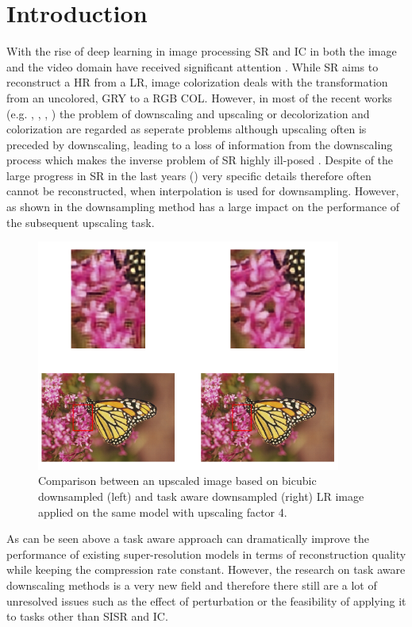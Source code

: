 \newpage
\section{Introduction}
\label{sec:Introduction}
With the rise of deep learning in image processing \ac{SR} and \ac{IC}
in both the image and the video domain have received significant
attention \cite{DLFISRAS}. While SR aims to reconstruct a \ac{HR} from a
\ac{LR}, image colorization deals with the transformation from an uncolored,
\ac{GRY} to a RGB \ac{COL}.
However, in most of the recent works (e.g. \cite{AFPATSISR}, \cite{ESRGAN},
\cite{RBPNFVSR}, \cite{LFVSRTHROFE}) the problem of downscaling and upscaling
or decolorization and colorization are regarded as seperate problems although
upscaling often is preceded by downscaling, leading to a loss of information
from the downscaling process which makes the inverse problem of SR highly
ill-posed \cite{TAID}. Despite of the large progress in SR in the last years
(\cite{DLFISRAS}) very specific details therefore often cannot be reconstructed,
when interpolation is used for downsampling. However, as shown in
 the downsampling method has a large impact on
the performance of the subsequent upscaling task.

\begin{figure}[!htbp]
\centering
\includegraphics[width=10cm]{figures/shrb_vs_shrt_x4}
\caption{Comparison between an upscaled image based on bicubic downsampled
(left) and task aware downsampled (right) LR image applied on the same model
with upscaling factor 4.}
\label{fig:shrb_vs_shrt_x4}
\end{figure}

As can be seen above a task aware approach can dramatically improve the
performance of existing super-resolution models in terms of reconstruction
quality while keeping the compression rate constant. However, the research on task
aware downscaling methods is a very new field and therefore there still are
a lot of unresolved issues such as the effect of perturbation or the feasibility of
applying it to tasks other than \ac{SISR} and \ac{IC}.

